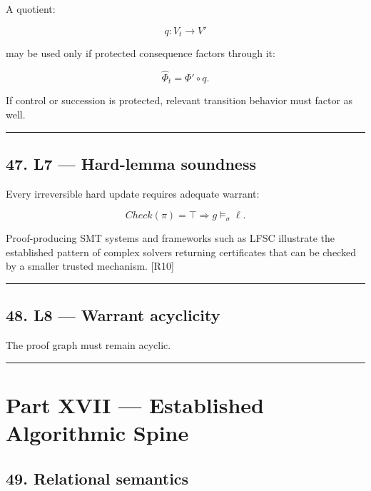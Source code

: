 \documentclass[
]{article}
\begin{document}
A quotient:

\[
q:V_t\to V'
\]

may be used only if protected consequence factors through it:

\[
\boxed{
\widehat\Phi_t
=
\Phi'\circ q.
}
\]

If control or succession is protected, relevant transition behavior must
factor as well.

\begin{center}\rule{0.5\linewidth}{0.5pt}\end{center}

\subsection{47. L7 --- Hard-lemma
soundness}\label{l7-hard-lemma-soundness}

Every irreversible hard update requires adequate warrant:

\[
\boxed{
Check(\pi)=\top
\Longrightarrow
g\models_\sigma\ell.
}
\]

Proof-producing SMT systems and frameworks such as LFSC illustrate the
established pattern of complex solvers returning certificates that can
be checked by a smaller trusted mechanism. {[}R10{]}

\begin{center}\rule{0.5\linewidth}{0.5pt}\end{center}

\subsection{48. L8 --- Warrant acyclicity}\label{l8-warrant-acyclicity}

The proof graph must remain acyclic.

\begin{center}\rule{0.5\linewidth}{0.5pt}\end{center}

\section{Part XVII --- Established Algorithmic
Spine}\label{part-xvii-established-algorithmic-spine}

\subsection{49. Relational semantics}\label{relational-semantics}
\end{document}
